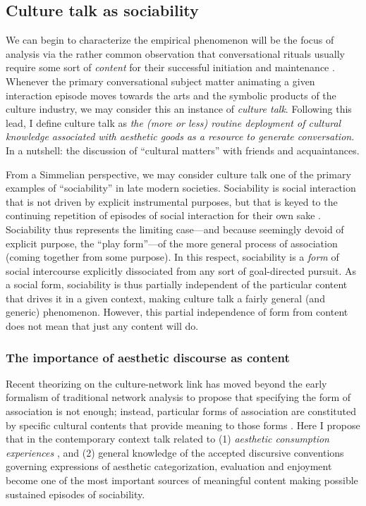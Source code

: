 \subsection{Culture talk as sociability}
We can begin to characterize the empirical phenomenon will be the focus of analysis via the rather common observation that conversational rituals usually require some sort of \emph{content} for their successful initiation and maintenance \citep{dimaggio87, collins75}. Whenever the primary conversational subject matter animating a given interaction episode moves towards the arts and the symbolic products of the culture industry, we may consider this an instance of  \emph{culture talk}. Following this lead, I define culture talk as \emph{the (more or less) routine deployment of cultural knowledge associated with aesthetic goods as a resource to generate conversation}. In a nutshell: the discussion of ``cultural matters'' with friends and acquaintances.

From a Simmelian perspective, we may consider culture talk one of the primary examples of ``sociability'' in late modern societies. Sociability is social interaction that is not driven by explicit instrumental purposes, but that is keyed to the continuing repetition of episodes of social interaction for their own sake \citep{simmel49}. Sociability thus represents the limiting case---and because seemingly devoid of explicit purpose, the ``play form''---of the more general process of association (coming together from some purpose).  In this respect, sociability is a \emph{form} of social intercourse explicitly dissociated from any sort of goal-directed pursuit. As a social form, sociability is thus partially independent of the particular content that drives it in a given context, making culture talk a fairly general (and generic) phenomenon.  However, this partial independence of form from content does not mean that just any content will do.

\subsubsection{The importance of aesthetic discourse as content}
Recent theorizing on the culture-network link has moved beyond the early formalism of traditional network analysis to propose that specifying the form of association is not enough; instead, particular forms of association are constituted by specific cultural contents that provide meaning to those forms \citep{fuhse09}.  Here I propose that in the contemporary context talk related to (1)  \emph{aesthetic consumption experiences} \citep{holbrook_hirschman82, deighton92, gainer95}, and (2) general knowledge of the accepted discursive conventions governing expressions of aesthetic categorization, evaluation and enjoyment \citep{baumann07, frith98} become one of the most important sources of meaningful content making possible sustained episodes of sociability.

